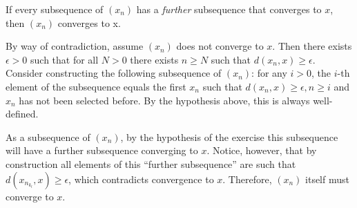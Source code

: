 \begin{exercise}{39}
    If every subsequence of $(x_n)$ has a \textit{further} subsequence that converges to $x$, then $(x_n)$ converges to x.
\end{exercise}

\begin{solution}

    By way of contradiction, assume $(x_n)$ does not converge to $x$.
    Then there exists $\epsilon > 0$ such that for all $N > 0$ there exists $n \geq N$ such that $d(x_n, x) \geq \epsilon$.
    Consider constructing the following subsequence of $(x_n)$: for any $i > 0$, the $i$-th element of the subsequence equals the first $x_n$ such that $d(x_n, x) \geq \epsilon, n \geq i$ and $x_n$ has not been selected before.
    By the hypothesis above, this is always well-defined.

    As a subsequence of $(x_n)$, by the hypothesis of the exercise this subsequence will have a further subsequence converging to $x$.
    Notice, however, that by construction all elements of this ``further subsequence'' are such that $d(x_{n_{k_l}}, x) \geq \epsilon$, which contradicts convergence to $x$.
    Therefore, $(x_n)$ itself must converge to $x$.
\end{solution}